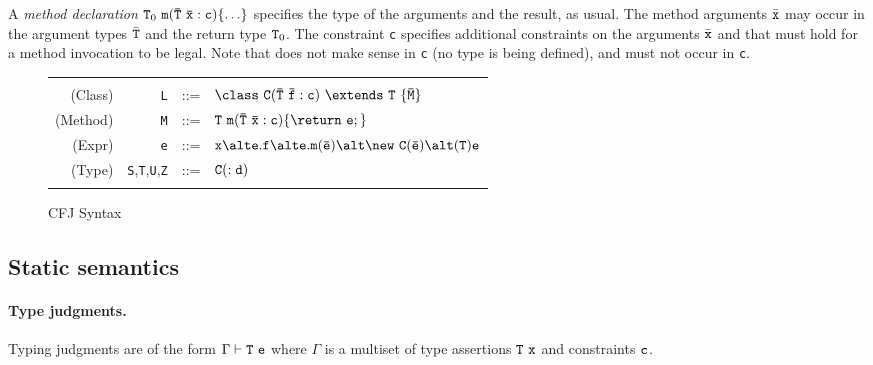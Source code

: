 A {\em method declaration} ${\tt T}_0\ {\tt m(\bar{\tt T}\ \bar{\tt x} :
c)\{\ldots\}}$ specifies the type of the arguments and the result, as
usual.  The method arguments $\bar{\tt x}$ may occur in the argument
types $\bar{\tt T}$ and the return type ${\tt T}_0$.  The constraint
{\tt c} specifies additional constraints on the arguments $\bar{\tt
x}$ and
\this{} that must hold for a method invocation to be legal. Note that
\self{} does not make sense in {\tt c} (no type is being defined), and must not occur in {\tt c}.

\begin{figure}
\begin{tabular}{rrcl}
&&&\\
(Class) & {\tt L} &{::=}& $\tt\class \ C(\bar{T}\ \bar{f}:c)\  \extends\ T\ \{\bar{M}\}$ \\
(Method)& {\tt M} &{::=}& $\tt T\ m(\bar{T}\ \bar{x}:c)\{\return\ e;\}$\\
(Expr)& {\tt e} &{::=}& $\tt x \alt e.f \alt e.m(\bar{e})\alt \new\ C(\bar{e})\alt (T)e$ \\
(Type)& {\tt S},{\tt T},{\tt U},{\tt Z}&{::=}& $\tt C(:d)$\\
&&&\\
\end{tabular}

\caption{CFJ Syntax}
\label{CFJ-syntax}
\end{figure}

\subsection{Static semantics}

\paragraph{Type judgments.}
Typing judgments are of the form $\Gamma \vdash {\tt T}\ {\tt e}$
where $\Gamma$ is a multiset of type assertions ${\tt T}\ {\tt x}$ and
constraints ${\tt c}$. 

